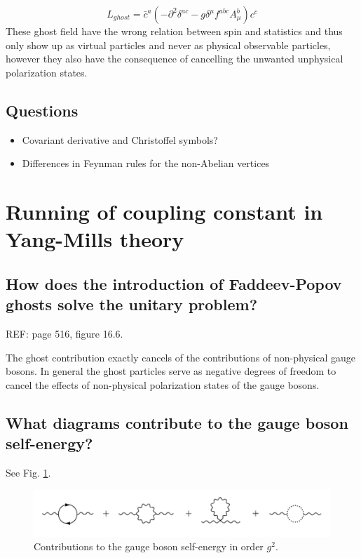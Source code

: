 \documentclass[paper=a4, fontsize=11pt]{scrartcl} %
\numberwithin{equation}{section} %
\numberwithin{figure}{section} %
\numberwithin{table}{section} %
\newcommand{\parentheses}[1]{\ensuremath{\left( #1 \right)}}
\begin{document}
\begin{equation}
L_{ghost}=\bar{c}^a \parentheses{-\partial^2 \delta^{ac} -g \delta^{\mu} f^{abc} A^b_{\mu}}c^c
\end{equation}
These ghost field have the wrong relation between spin and statistics and thus only show up as virtual particles and never as physical observable particles, however they also have the consequence of cancelling the unwanted unphysical polarization states.



\subsection{Questions}
\begin{itemize}
\item Covariant derivative and Christoffel symbols?
\item Differences in Feynman rules for the non-Abelian vertices
\end{itemize}

\section{Running of coupling constant in Yang-Mills theory}

\subsection{How does the introduction of Faddeev-Popov ghosts solve the unitary problem?}

REF: page 516, figure 16.6.

The ghost contribution exactly cancels of the contributions of non-physical gauge bosons. In general the ghost particles serve as negative degrees of freedom to cancel the effects of non-physical polarization states of the gauge bosons.

\subsection{What diagrams contribute to the gauge boson self-energy?}
See Fig. \ref{fig:Gauge_Boson_Self-Energy}.

\begin{figure}[hbtp]
\centering
\includegraphics[width=\textwidth]{Gauge_Boson_Self-Energy.png}
\caption{Contributions to the gauge boson self-energy in order $g^2$.}
\label{fig:Gauge_Boson_Self-Energy}
\end{figure}
\end{document}
